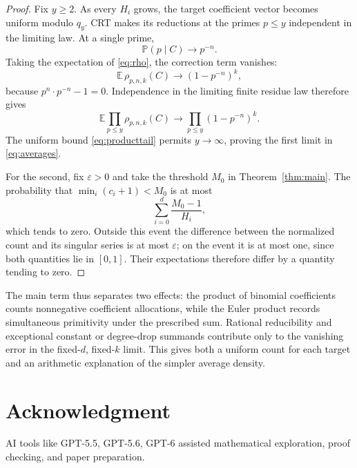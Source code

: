 \documentclass[11pt]{amsart}
\newcommand{\Prob}{\mathbb P}
\newcommand{\Ex}{\mathbb E}
\theoremstyle{definition}
\theoremstyle{remark}
\begin{document}
\begin{proof}
Fix $y\ge2$. As every $H_i$ grows, the target coefficient vector
becomes uniform modulo $q_y$. CRT makes its reductions at the primes
$p\le y$ independent in the limiting law. At a single prime,
\[
\Prob(p\mid C)\longrightarrow p^{-n}.
\]
Taking the expectation of \eqref{eq:rho}, the correction term vanishes:
\[
\Ex\,\rho_{p,n,k}(C)\longrightarrow
(1-p^{-n})^k,
\]
because $p^n\cdot p^{-n}-1=0$. Independence in the limiting finite
residue law therefore gives
\[
\Ex\prod_{p\le y}\rho_{p,n,k}(C)
\longrightarrow\prod_{p\le y}(1-p^{-n})^k.
\]
The uniform bound \eqref{eq:producttail} permits $y\to\infty$,
proving the first limit in \eqref{eq:averages}.

For the second, fix $\varepsilon>0$ and take the threshold $M_0$ in
Theorem~\ref{thm:main}. The probability that
$\min_i(c_i+1)<M_0$ is at most
\[
\sum_{i=0}^d\frac{M_0-1}{H_i},
\]
which tends to zero. Outside this event the difference between the
normalized count and its singular series is at most $\varepsilon$;
on the event it is at most one, since both quantities lie in $[0,1]$.
Their expectations therefore differ by a quantity tending to zero.
\end{proof}

The main term thus separates two effects: the product of binomial
coefficients counts nonnegative coefficient allocations, while the
Euler product records simultaneous primitivity under the prescribed
sum. Rational reducibility and exceptional constant or degree-drop
summands contribute only to the vanishing error in the fixed-$d$,
fixed-$k$ limit. This gives both a uniform count for each target and
an arithmetic explanation of the simpler average density.

\section*{Acknowledgment}
AI tools like GPT-5.5, GPT-5.6, GPT-6 assisted mathematical exploration, proof
checking, and paper preparation.
\end{document}
